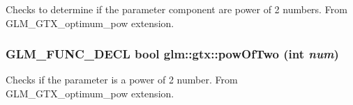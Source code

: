 Checks to determine if the parameter component are power of 2 numbers. From GLM\_\-GTX\_\-optimum\_\-pow extension. \hypertarget{group__gtx__optimum__pow_g399b24df28267c1f061c462dd359affd}{
\subsubsection[powOfTwo]{\setlength{\rightskip}{0pt plus 5cm}GLM\_\-FUNC\_\-DECL bool glm::gtx::powOfTwo (int {\em num})}}
\label{group__gtx__optimum__pow_g399b24df28267c1f061c462dd359affd}


Checks if the parameter is a power of 2 number. From GLM\_\-GTX\_\-optimum\_\-pow extension. 